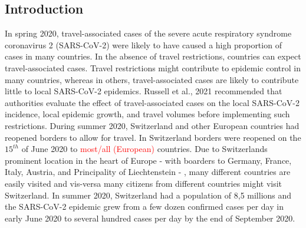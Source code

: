 \documentclass[10pt, a4paper, twoside]{article}
\begin{document}
\begin{multicols}{2}
\section{Introduction}
In spring 2020, travel-associated cases of the severe acute respiratory syndrome coronavirus 2 (SARS-CoV-2) were likely to have caused a high proportion of cases in many countries.\cite{russell_effect_2021} 
In the absence of travel restrictions, countries can expect travel-associated cases.\cite{russell_effect_2021} 
Travel restrictions might contribute to epidemic control in many countries, whereas in others, travel-associated cases are likely to contribute little to local SARS-CoV-2 epidemics.\cite{russell_effect_2021}  
Russell et al., 2021 recommended that authorities evaluate the effect of travel-associated cases on the local SARS-CoV-2 incidence, local epidemic growth, and travel volumes before implementing such restrictions.\cite{russell_effect_2021} 
During summer 2020, Switzerland and other European countries had reopened borders to allow for travel. 
In Switzerland borders were reopened on the $15^{th}$ of June 2020 to \textcolor{red}{most/all (European)} countries. 
Due to Switzerlands prominent location in the heart of Europe - with boarders to Germany, France, Italy, Austria, and Principality of Liechtenstein - , many different countries are easily visited and vis-versa many citizens from different countries might visit Switzerland. 
In summer 2020, Switzerland had a population of 8,5 millions and the SARS-CoV-2 epidemic grew from a few dozen confirmed cases per day in early June 2020 to several hundred cases per day by the end of September 2020. 


\end{multicols}
\end{document}
